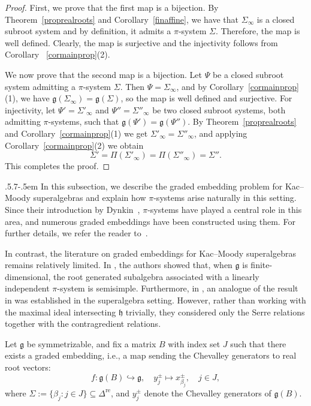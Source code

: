 \documentclass[11pt,reqno]{amsart}
\makeatletter
\theoremstyle{plain}
\theoremstyle{definition}
\theoremstyle{remark}
\numberwithin{equation}{section}
\def\subsection{\def\@secnumfont{\bfseries}\@startsection{subsection}{2}%
  {\parindent}{.5\linespacing\@plus.7\linespacing}{-.5em}%
  {\normalfont\bfseries}}
\makeatother
\begin{document}
\begin{proof}
    First, we prove that the first map is a bijection. By Theorem~\ref{proprealroots} and Corollary~\ref{finaffine}, we have that $\Sigma_\infty$ is a closed subroot system and by definition, it admits a $\pi$-system $\Sigma.$ Therefore, the map is well defined. Clearly, the map is surjective and the injectivity follows from Corollary ~\ref{cormainprop}(2).

    We now prove that the second map is a bijection. Let $\Psi$ be a closed subroot system admitting a $\pi$-system $\Sigma$. Then $\Psi = \Sigma_\infty$, and by Corollary~\ref{cormainprop}(1), we have $\mathfrak g(\Sigma_\infty) = \mathfrak g(\Sigma)$, so the map is well defined and surjective. For injectivity, let $\Psi' = \Sigma'_\infty$ and $\Psi'' = \Sigma''_\infty$ be two closed subroot systems, both admitting $\pi$-systems, such that $\mathfrak g(\Psi') = \mathfrak g(\Psi'')$. By Theorem~\ref{proprealroots} and Corollary~\ref{cormainprop}(1) we get $\Sigma'_\infty = \Sigma''_\infty$, and applying Corollary~\ref{cormainprop}(2) we obtain
    $$\Sigma'=\Pi(\Sigma'_\infty)=\Pi(\Sigma''_\infty)=\Sigma''.$$
    This completes the proof.
\end{proof}
\subsection{}\label{secemb}
In this subsection, we describe the graded embedding problem for Kac--Moody superalgebras and explain how $\pi$-systems arise naturally in this setting. Since their introduction by Dynkin~\cite{dynkin52semisimple}, $\pi$-systems have played a central role in this area, and numerous graded embeddings have been constructed using them. For further details, we refer the reader to~\cite{feingold2004subalgebras, viswanath08embedding}.

In contrast, the literature on graded embeddings for Kac--Moody superalgebras remains relatively limited. In \cite{vander87regular}, the authors showed that, when $\mathfrak{g}$ is finite-dimensional, the root generated subalgebra associated with a linearly independent $\pi$-system is semisimple. Furthermore, in \cite{Nayak13Embedding}, an analogue of the result in \cite{viswanath08embedding} was established in the superalgebra setting. However, rather than working with the maximal ideal intersecting $\mathfrak{h}$ trivially, they considered only the Serre relations together with the contragredient relations. 
 
Let $\mathfrak{g}$ be symmetrizable, and fix a matrix $B$ with index set $J$ such that there exists a graded embedding, i.e., a map sending the Chevalley generators to real root vectors:
\[
f: \mathfrak{g}(B) \hookrightarrow \mathfrak{g}, \quad y_j^\pm \mapsto x_{\beta_j}^\pm, \quad j \in J,
\]
where $\Sigma := \{\beta_j : j \in J\} \subseteq \Delta^{\mathrm{re}}$, and $y_j^\pm$ denote the Chevalley generators of $\mathfrak{g}(B)$.
\end{document}
